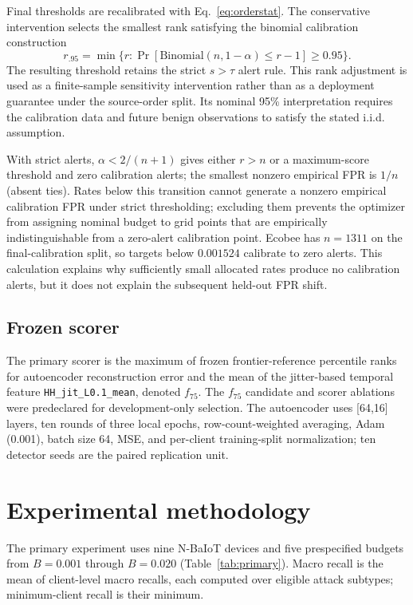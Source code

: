\documentclass[pdflatex,sn-mathphys-num]{sn-jnl}
\begin{document}
Final thresholds are recalibrated with Eq.~\eqref{eq:orderstat}. The conservative intervention selects the smallest rank satisfying the binomial calibration construction \cite{angelopoulos2024conformalrisk}
\begin{equation}
 r_{.95}=\min\{r:\Pr[\mathrm{Binomial}(n,1-\alpha)\leq r-1]\geq0.95\}.
 \label{eq:conservative}
\end{equation}
The resulting threshold retains the strict $s>\tau$ alert rule. This rank adjustment is used as a finite-sample sensitivity intervention rather than as a deployment guarantee under the source-order split. Its nominal 95\% interpretation requires the calibration data and future benign observations to satisfy the stated i.i.d. assumption.

With strict alerts, $\alpha<2/(n+1)$ gives either $r>n$ or a maximum-score threshold and zero calibration alerts; the smallest nonzero empirical FPR is $1/n$ (absent ties). Rates below this transition cannot generate a nonzero empirical calibration FPR under strict thresholding; excluding them prevents the optimizer from assigning nominal budget to grid points that are empirically indistinguishable from a zero-alert calibration point. Ecobee has $n=1311$ on the final-calibration split, so targets below $0.001524$ calibrate to zero alerts. This calculation explains why sufficiently small allocated rates produce no calibration alerts, but it does not explain the subsequent held-out FPR shift.

\subsection{Frozen scorer}
The primary scorer is the maximum of frozen frontier-reference percentile ranks for autoencoder reconstruction error and the mean of the jitter-based temporal feature \texttt{HH\_jit\_L0.1\_mean}, denoted $f_{75}$. The $f_{75}$ candidate and scorer ablations were predeclared for development-only selection. The autoencoder uses [64,16] layers, ten rounds of three local epochs, row-count-weighted averaging, Adam (0.001), batch size 64, MSE, and per-client training-split normalization; ten detector seeds are the paired replication unit.

\section{Experimental methodology}\label{sec:experiments}
The primary experiment uses nine N-BaIoT devices and five prespecified budgets from $B=0.001$ through $B=0.020$ (Table~\ref{tab:primary}). Macro recall is the mean of client-level macro recalls, each computed over eligible attack subtypes; minimum-client recall is their minimum.
\end{document}
